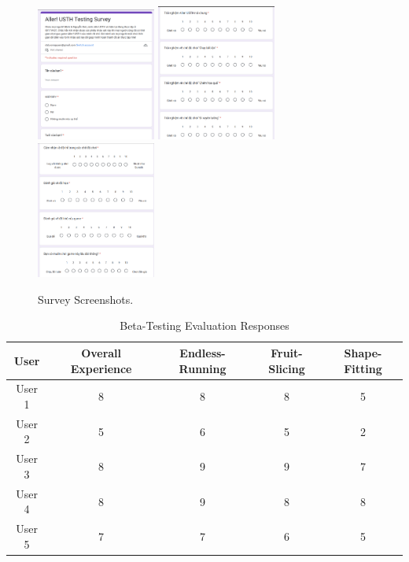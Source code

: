 \documentclass[12pt]{article}
\begin{document}
\begin{figure}[ht]
    \centering
    \includegraphics[width=0.35\textwidth]{survey1.png}
    \includegraphics[width=0.35\textwidth]{survey2.png}
    \includegraphics[width=0.35\textwidth]{survey3.png}
    \caption{Survey Screenshots.}
\end{figure}

\begin{table}[]
    \center
    \caption{Beta-Testing Evaluation Responses}
    \begin{tabular}{|c|c|c|c|c|}
    \hline
    \rowcolor[HTML]{C0C0C0} 
    \textbf{User} & \textbf{Overall Experience} & \textbf{Endless-Running} & \textbf{Fruit-Slicing} & \textbf{Shape-Fitting} \\ \hline
    User 1        & 8                           & 8                        & 8                      & 5                      \\ \hline
    User 2        & 5                           & 6                        & 5                      & 2                      \\ \hline
    User 3        & 8                           & 9                        & 9                      & 7                      \\ \hline
    User 4        & 8                           & 9                        & 8                      & 8                      \\ \hline
    User 5        & 7                           & 7                        & 6                      & 5                      \\ \hline
    \end{tabular}
\end{table}
\end{document}
